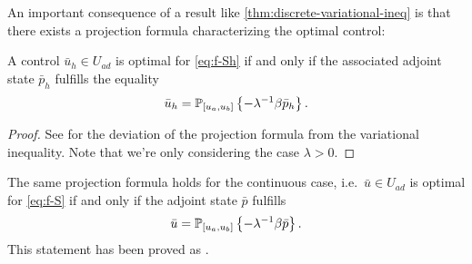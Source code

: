 \documentclass[../thesis.tex]{subfiles}
\begin{document}
An important consequence of a result like \cref{thm:discrete-variational-ineq} is that there exists a projection formula characterizing the optimal control:
\begin{theorem}
\label{thm:projection-formula}
A control $\bar{u}_h \in U_{ad}$ is optimal for \cref{eq:f-Sh} if and only if the associated adjoint state $\bar{p}_h$ fulfills the equality
\[
	\bar{u}_h = \mathbb{P}_{[u_a, u_b]} \left\{ - \lambda^{-1} \beta \bar{p}_h \right\}.
\]
\end{theorem}
\begin{proof}
See \cite[p.\ 53ff.]{Troeltzsch} for the deviation of the projection formula from the variational inequality.
Note that we're only considering the case $\lambda > 0$.
\end{proof}
The same projection formula holds for the continuous case, i.e.\ $\bar{u} \in U_{ad}$ is optimal for \cref{eq:f-S} if and only if the adjoint state $\bar{p}$ fulfills
\[
	\bar{u} = \mathbb{P}_{[u_a, u_b]} \left\{ - \lambda^{-1} \beta \bar{p} \right\}.
\]
This statement has been proved as \cite[Satz 3.20]{Troeltzsch}.
\end{document}
